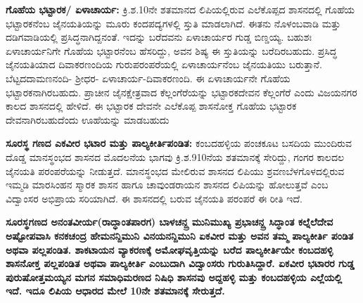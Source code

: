 \textbf{ಗೊಹೆಯ ಭಟ್ಟಾರಕ/ ಏಳಾಚಾರ್ಯ:} ಕ್ರಿ.ಶ.10ನೇ ಶತಮಾನದ ಲಿಪಿಯಲ್ಲಿರುವ ಎಲೆಕೊಪ್ಪದ ಶಾಸನದಲ್ಲಿ ಗೊಹೆಯ ಭಟ್ಟಾರಕನೆಂಬ ಜೈನಯತಿಯನ್ನು ಮೂರು ಕಂದಪದ್ಯಗಳಲ್ಲಿ ಸ್ತುತಿ ಮಾಡಲಾಗಿದೆ. ಈತನು ನೊಳಂಬವಾಡಿ ಮತ್ತು ದಡಿಗವಾಡಿಯಲ್ಲಿ ಪ್ರಸಿದ್ಧನಾಗಿದ್ದನಂತೆ. ಇದನ್ನು ಬರೆದವನು ಏಳಾಚಾರ್ಯರ ಗುಡ್ಡ ಬಿಣ್ಡಯ್ಯ. ಬಹುಶಃ ಏಳಾಚಾರ್ಯನಿಗೇ ಗೊಹೆಯ ಭಟ್ಟಾರನೆಂಬ ಹೆಸರಿದ್ದು, ಅವನ ಶಿಷ್ಯ ಈ ಸ್ತುತಿಯನ್ನು ಬರೆದಿರಬಹುದು. ಪ್ರಸಿದ್ಧ ಜೈನ\-ಯತಿಯಾದ ದಿವಾಕರಣಂದಿಯ ಗುರುಪರಂಪರೆಯಲ್ಲಿ ಏಳಾಚಾರ್ಯನೆಂಬ ಜೈನಯತಿಯು ಬರುತ್ತಾನೆ. ಬೆಟ್ಟದ\break ದಾಮಣನಂದಿ- ಶ‍್ರೀಧರ- ಏಳಾಚಾರ್ಯ-ದಿವಾಕರಣಂದಿ. ಈ ಏಳಾಚಾರ್ಯನೇ ಗೊಹೆಯ ಭಟ್ಟಾರಕನಾಗಿರಬಹುದು. ಪ್ರಾಚೀನ ಜೈನಕ್ಷೇತ್ರವಾದ ಕೆಲ್ಲಂಗೆರೆಯನ್ನು ಭಟ್ಟಾರಕದೇವನ ಕೆಲ್ಲಂಗೆರೆ ಎಂದು ವಿಜಯನಗರ ಕಾಲದ ಶಾಸನದಲ್ಲಿ ಹೇಳಿದೆ. ಈ ಭಟ್ಟಾರಕ ದೇವನೇ ಎಲೆಕೊಪ್ಪ ಶಾಸನೋಕ್ತ ಗೊಹೆಯ ಭಟ್ಟಾರಕ ದೇವನಾಗಿರಬಹುದೆಂದು ಊಹೆಯನ್ನು ಮಾಡಬಹುದು

\textbf{ಸೂರಸ್ಥ ಗಣದ ಎಕವೀರ ಭಟಾರ ಮತ್ತು ಪಾಲ್ಯಕೀರ್ತಿಪಂಡಿತ: } ಕಂಬದಹಳ್ಳಿಯ ಪಂಚಕೂಟ ಬಸದಿಯ ಮುಂದಿರುವ ದೊಡ್ಡ ಮಾನಸ್ಥಂಭದ ಶಾಸನದ ಮೊದಲನೆಯ ಭಾಗವು ಕ್ರಿ.ಶ.9\enginline{-}10ನೆಯ ಶತಮಾನಕ್ಕೆ ಸೇರಿದ್ದು, ಗಂಗರ ಕಾಲದಲ ಜೈನಯತಿ ಪರಂಪರೆಯನ್ನು ನೀಡುತ್ತದೆ. ಮಾನಸ್ಥಂಭದ ಮೇಲಿರುವ ಶಾಸನದ ಲಿಪಿಯು ಶ್ರವಣಬೆಳಗೊಳ\-ದಲ್ಲಿರುವ ಇಮ್ಮಡಿ ಮಾರಸಿಂಹನ ಸ್ಮಾರಕ ಶಾಸನ ಹಾಗೂ ಚಾವುಂಡರಾಯನ ಶಾಸನದ ಲಿಪಿಯನ್ನು ಹೋಲುತ್ತವೆ ಎಂಬ ವಿದ್ವಾಂಸರ ಅಭಿಪ್ರಾಯ ಸರಿಯಾಗಿದೆ. ಈ ಶಾಸನದಲ್ಲಿ ಬರುವ ಜೈನಯತಿ ಪರಂಪರೆ ಈ ರೀತಿ ಇದೆ.

\textbf{ಸೂರಸ್ಥಗಣದ ಅನಂತವೀರ್ಯ(ರಾದ್ಧಾಂತಪಾರಗ)\general{\enginline{-}} ಬಾಳಚನ್ದ್ರ ಮುನಿಮುಖ್ಯ \general{\enginline{-}} ಪ್ರಭಾಚನ್ದ್ರ ಸಿದ್ಧಾಂತ\general{\enginline{-}} ಕಲ್ನೆಲೆದೇವ\general{\enginline{-}} ಅಷ್ಟೋಪವಾಸಿ ಕನಕಚಂದ್ರ \general{\enginline{-}} ಹೇಮನನ್ದಿಮುನಿ \general{\enginline{-}} ವಿನಯನನ್ದಿಮುನಿ \general{\enginline{-}} ಏಕವೀರ ಮತ್ತು ಅವನ ತಮ್ಮ ಪಾಲ್ಯಕೀರ್ತಿ ಪಂಡಿತ ಅಥವಾ ಪಲ್ಲಪಂಡಿತ. ಶಾಕಟಾಯನ ವ್ಯಾಕರಣಕ್ಕೆ ಅಮೋಘವೃತ್ತಿಯನ್ನು ಬರೆದ ಪಾಲ್ಯಕೀರ್ತಿಯೇ ಕಂಬದಹಳ್ಳಿ ಶಾಸನೋಕ್ತ ಪಲ್ಲಪಂಡಿತ ಅಥವಾ ಪಾಲ್ಯಕೀರ್ತಿ ಎಂಬುದಾಗಿ ವಿದ್ವಾಂಸರು ಗುರುತಿಸಿದ್ದಾರೆ. ಏಕವೀರ ಭಟಾರರ ಗುಡ್ಡ ಪುರುಷೋತ್ತಮಯ್ಯನ ಮಗನ ಸಮಾಧಿಮರಣದ ನಿಷಿಧಿ ಶಾಸನವು ಅದ್ದಹಳ್ಳಿ ಮತ್ತು ಕಂಬದಹಳ್ಳಿಯ ಎಲ್ಲೆಯಲ್ಲಿ ಇದೆ. ಇದೂ ಲಿಪಿಯ ಆಧಾರದ ಮೇಲೆ 10ನೇ ಶತಮಾನಕ್ಕೆ ಸೇರುತ್ತದೆ.}

